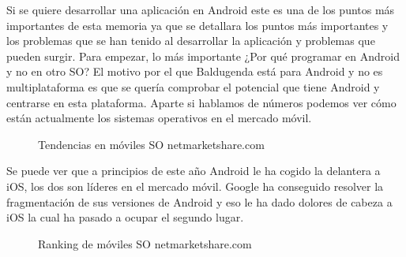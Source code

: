 Si se quiere desarrollar una aplicación en Android este es una de los puntos más importantes de esta memoria ya que se detallara los puntos más importantes y los problemas que se han tenido al desarrollar la aplicación y problemas que pueden surgir.
Para empezar, lo más importante ¿Por qué programar en Android y no en otro SO?
El motivo por el que Baldugenda está para Android  y no es multiplataforma es que se quería 
comprobar el potencial que tiene Android y centrarse en esta plataforma.
Aparte si hablamos de números podemos ver cómo están actualmente los sistemas operativos en el mercado móvil.

\begin{figure}[H] 
  \begin{center} 
    \caption{Tendencias en móviles SO netmarketshare.com} 
    \label{fig:TendenciasSO} 
  \end{center} 
\end{figure}

Se puede ver que a principios de este año Android le ha cogido la delantera a iOS, los dos son líderes en el mercado móvil.
Google ha conseguido resolver la fragmentación de sus versiones de Android y eso le ha dado dolores de cabeza a iOS la cual ha pasado a ocupar el segundo lugar.

\begin{figure}[H] 
  \begin{center} 
    \caption{Ranking de móviles SO netmarketshare.com} 
    \label{fig:RankingSO} 
  \end{center} 
\end{figure}

